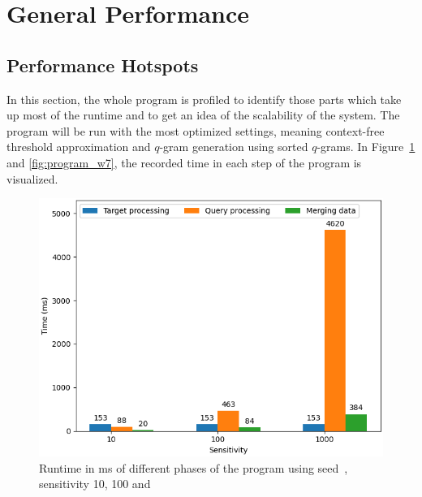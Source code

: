 \documentclass[twoside,a4paper,bsc]{master}
\newcommand{\Qgram}[1]{\(#1\)-gram}
\begin{document}
\section{General Performance}
\subsection{Performance Hotspots}
In this section, the whole program is profiled to
identify those parts which take up most of the runtime and to get an idea
of the scalability of the system. The program will
be run with the most optimized settings, meaning context-free threshold
approximation and \Qgram{q} generation using sorted \(q\)-grams.
In Figure~\ref{fig:program_w6} and \ref{fig:program_w7}, the recorded time in 
each step of the program is visualized.

\begin{figure}
\centering
\includegraphics[scale=0.6]{graphics/program_w6.png}
\caption{Runtime in ms of different phases of the program
using seed~, sensitivity 10, 100 and }
\label{fig:program_w6}
\end{figure}
\end{document}
